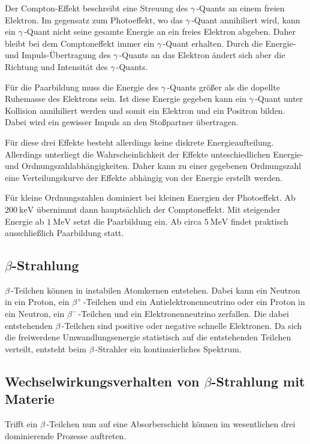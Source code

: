 Der Compton-Effekt beschreibt eine Streuung des $\gamma$\,-Quants an einem freien Elektron. Im gegensatz zum Photoeffekt, wo das $\gamma$\,-Quant annihiliert wird, kann ein 
$\gamma$\,-Quant nicht seine gesamte Energie an ein freies Elektron abgeben. Daher bleibt bei dem Comptoneffekt immer ein $\gamma$\,-Quant erhalten. Durch die Energie- und 
Impuls-Übertragung des $\gamma$\,-Quants an das Elektron ändert sich aber die Richtung und Intensität des $\gamma$\,-Quants. 

Für die Paarbildung muss die Energie des $\gamma$\,-Quants größer als die dopellte Ruhemasse des Elektrons sein. Ist diese Energie gegeben kann ein $\gamma$\,-Quant unter 
Kollision annihiliert werden und somit ein Elektron und ein Positron bilden. Dabei wird ein gewisser Impuls an den Stoßpartner übertragen.

Für diese drei Effekte besteht allerdings keine diskrete Energieaufteilung. Allerdings unterliegt die Wahrscheinlichkeit der Effekte unteschiedlichen Energie- und 
Ordnungszahlabhängigkeiten. Daher kann zu einer gegebenen Ordnungszahl eine Verteilungskurve der Effekte abhängig von der Energie erstellt werden.

Für kleine Ordnungszahlen dominiert bei kleinen Energien der Photoeffekt. Ab $\qty{200}{\kilo\electronvolt}$ übernimmt dann hauptsächlich der Comptoneffekt. Mit steigender 
Energie ab $\qty{1}{\mega\electronvolt}$ setzt die Paarbildung ein. Ab circa $\qty{5}{\mega\electronvolt}$ findet praktisch ausschließlich Paarbildung statt.

\subsection{\texorpdfstring{$\beta$-Strahlung}{Beta-Strahlung}}
\label{subsec:Betastrahlung}
$\beta$\,-Teilchen können in instabilen Atomkernen entstehen. Dabei kann ein Neutron in ein Proton, ein $\beta^+$\,-Teilchen und ein Antielektronenneutrino oder
ein Proton in ein Neutron, ein $\beta^-$\,-Teilchen und ein Elektronenneutrino zerfallen. Die dabei entstehenden $\beta$\,-Teilchen sind positive oder negative schnelle
Elektronen. Da sich die freiwerdene Umwandlungsenergie statistisch auf die entstehenden Teilchen verteilt, entsteht beim $\beta$\,-Strahler ein kontinuierliches Spektrum.

\subsection{\texorpdfstring{Wechselwirkungsverhalten von $\beta$-Strahlung mit Materie}{Wechselwirkungsverhalten von Beta-Strahlung mit Materie}}
\label{BetaWechselwirkung}
Trifft ein $\beta$\,-Teilchen nun auf eine Absorberschicht können im wesentlichen drei dominierende Prozesse auftreten.


